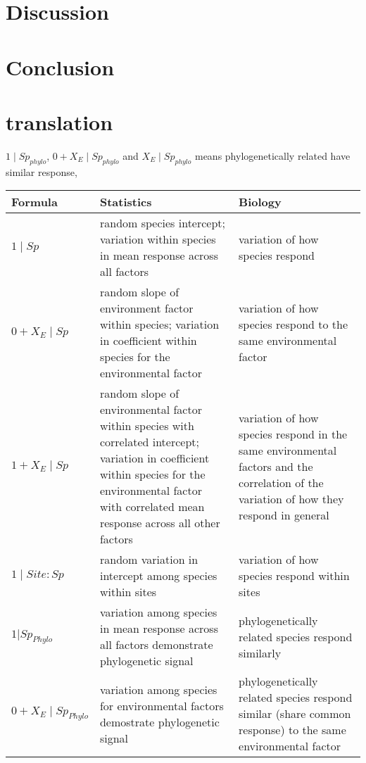 \section{Discussion}
\section{Conclusion}
\newpage
\section{translation}

$1 \mid Sp_{phylo}$, $0 + X_{E} \mid Sp_{phylo}$ and $X_{E} \mid Sp_{phylo}$ means phylogenetically related have similar response,   

\begin{tabularx}{\textwidth}{|l|X|X|}
\hline
Formula & Statistics & Biology \\
\hline
$1 \mid Sp$ &
random species intercept; variation within species in mean response across all factors &
variation of how species respond \\
\hline

$0 + X_{E} \mid Sp$ &
random slope of environment factor within species; variation in coefficient within species for the environmental factor &
variation of how species respond to the same environmental factor \\
\hline

$1 + X_{E} \mid Sp$ &
random slope of environmental factor within species with correlated intercept; variation in coefficient within species for the environmental factor with correlated mean response across all other factors &
variation of how species respond in the same environmental factors and the correlation of the variation of how they respond in general \\
\hline

$1 \mid Site:Sp $ &
random variation in intercept among species within sites &
variation of how species respond within sites \\
\hline

$1 | Sp_{Phylo} $ &
variation among species in mean response across all factors demonstrate phylogenetic signal &
phylogenetically related species respond similarly \\
\hline

$0 + X_{E} \mid Sp_{Phylo}$ &
variation among species for environmental factors demostrate phylogenetic signal &
phylogenetically related species respond similar (share common response) to the same environmental factor \\
\hline
\end{tabularx}
            
                                                                        
